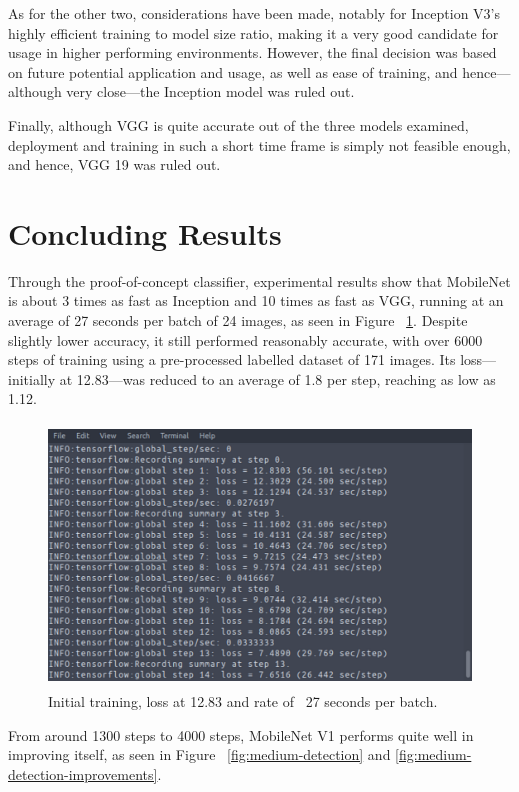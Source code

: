 \documentclass[se,blockletter]{uw-wkrpt}
\begin{document}
As for the other two, considerations have been made, notably for Inception V3's highly efficient training to model size ratio, making it a very good candidate for usage in higher performing environments. However, the final decision was based on future potential application and usage, as well as ease of training, and hence---although very close---the Inception model was ruled out. 

Finally, although VGG is quite accurate out of the three models examined, deployment and training in such a short time frame is simply not feasible enough, and hence, VGG 19 was ruled out. 
 

\section{Concluding Results}
Through the proof-of-concept classifier, experimental results show that MobileNet is about 3 times as fast as Inception and 10 times as fast as VGG, running at an average of 27 seconds per batch of 24 images, as seen in Figure ~\ref{fig:training-rate}. Despite slightly lower accuracy, it still performed reasonably accurate, with over 6000 steps of training using a pre-processed labelled dataset of 171 images. Its loss---initially at 12.83---was reduced to an average of 1.8 per step, reaching as low as 1.12. 

\begin{figure}
  \centering
  \includegraphics[height=7cm]{training-rate}
  \caption{Initial training, loss at 12.83 and rate of ~27 seconds per batch.}
  \label{fig:training-rate}
\end{figure}

From around 1300 steps to 4000 steps, MobileNet V1 performs quite well in improving itself, as seen in Figure ~\ref{fig:medium-detection} and \ref{fig:medium-detection-improvements}.
\end{document}
